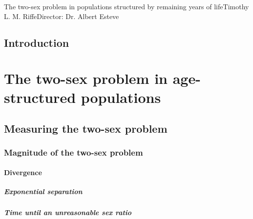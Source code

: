 \tableofcontents      %
\listoffigures        %
\listoftables         %

\startabstractpage
{The two-sex problem in populations structured by remaining years of
life}{Timothy L. M. Riffe}{Director: Dr. Albert Esteve}

\label{Abstract}

\startthechapters 
 \chapter{Introduction}
 \label{chap:Intro}
 

\part*{The two-sex problem in age-structured populations}
  \chapter{Measuring the two-sex problem}
    
    \section{Magnitude of the two-sex problem}
      
      \subsection{Divergence}
        
        \subsubsection{Exponential separation}
          
        \subsubsection{Time until an unreasonable sex ratio}
          
